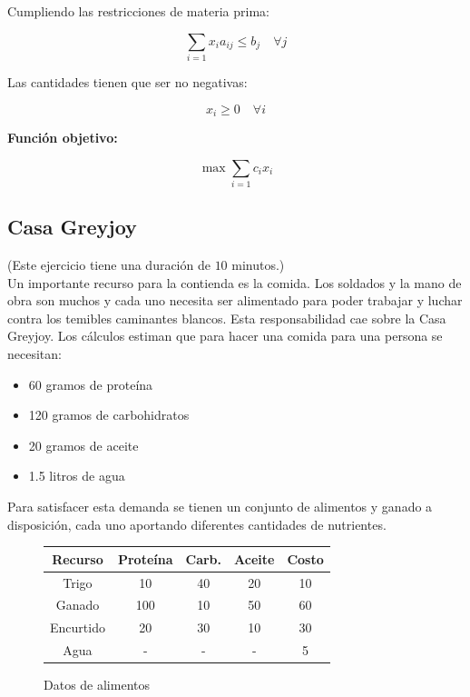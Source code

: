 \documentclass[a4paper,10pt,twocolumn]{article}
\theoremstyle{theorem}
\theoremstyle{definition}
\theoremstyle{remark}
\begin{document}
Cumpliendo las restricciones de materia prima:

$$
\sum_{i=1} x_i a_{ij} \le b_j \quad \forall j
$$

Las cantidades tienen que ser no negativas:

$$
x_i \ge 0 \quad \forall i
$$

\textbf{Función objetivo:}

$$
\max \sum_{i=1} c_i x_i
$$

	\subsection{Casa Greyjoy}\label{subsec:ejer_2}
(Este ejercicio tiene una duración de $10$ minutos.)\\

Un importante recurso para la contienda es la comida. Los soldados y la mano de obra son muchos y cada uno necesita ser alimentado para poder trabajar y luchar contra los temibles caminantes blancos. Esta responsabilidad cae sobre la Casa Greyjoy. Los cálculos estiman que para hacer una comida para una persona se necesitan:

\begin{itemize}

	\item 60  gramos de proteína
	\item 120 gramos de carbohidratos
	\item 20  gramos de aceite
	\item 1.5 litros de agua

\end{itemize}

Para satisfacer esta demanda se tienen un conjunto de alimentos y ganado a disposición, cada uno aportando diferentes cantidades de nutrientes.

\begin{figure}[h!]%
	\begin{center}
		\begin{tabular}{|c|c|c|c|c|} \hline
		Recurso		& Proteína 	& Carb. 	& Aceite   & Costo  \\ \hline
		Trigo		& 10		& 40				& 20	  & 10		\\ \hline
		Ganado		&100		& 10				& 50	  & 60		\\ \hline
		Encurtido	& 20		& 30				& 10	  & 30		\\ \hline
		Agua		& -			& -					& -		  & 5		\\ \hline
		\end{tabular}
	\caption{Datos de alimentos}\label{fig:ejer_2}
	\end{center}
\end{figure}
\end{document}
